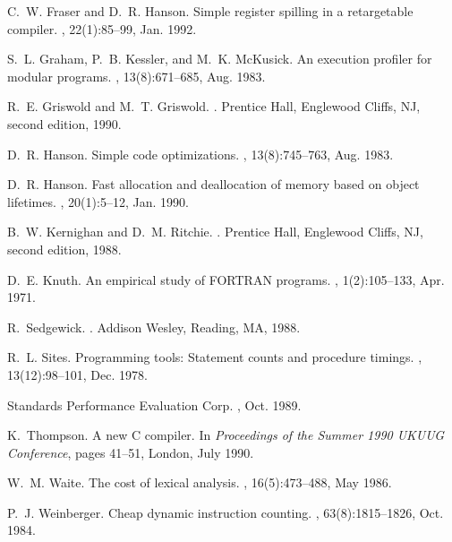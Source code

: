 \begin{thebibliography}{10}
C.~W. Fraser and D.~R. Hanson.
\newblock Simple register spilling in a retargetable compiler.
, 22(1):85--99, Jan. 1992.

S.~L. Graham, P.~B. Kessler, and M.~K. McKusick.
\newblock An execution profiler for modular programs.
, 13(8):671--685, Aug. 1983.

R.~E. Griswold and M.~T. Griswold.
.
\newblock Prentice Hall, Englewood Cliffs, NJ, second edition, 1990.

D.~R. Hanson.
\newblock Simple code optimizations.
, 13(8):745--763, Aug. 1983.

D.~R. Hanson.
\newblock Fast allocation and deallocation of memory based on object lifetimes.
, 20(1):5--12, Jan. 1990.

B.~W. Kernighan and D.~M. Ritchie.
.
\newblock Prentice Hall, Englewood Cliffs, NJ, second edition, 1988.

D.~E. Knuth.
\newblock An empirical study of {FORTRAN} programs.
, 1(2):105--133, Apr. 1971.

R.~Sedgewick.
.
\newblock Addison Wesley, Reading, MA, 1988.

R.~L. Sites.
\newblock Programming tools: Statement counts and procedure timings.
, 13(12):98--101, Dec. 1978.

Standards Performance Evaluation Corp.
, Oct. 1989.

K.~Thompson.
\newblock A new {C} compiler.
\newblock In {\em Proceedings of the Summer 1990 UKUUG Conference}, pages
  41--51, London, July 1990.

W.~M. Waite.
\newblock The cost of lexical analysis.
, 16(5):473--488, May 1986.

P.~J. Weinberger.
\newblock Cheap dynamic instruction counting.
, 63(8):1815--1826, Oct. 1984.

\end{thebibliography}


